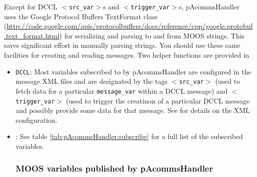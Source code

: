 \documentclass[11pt, letterpaper, oneside]{memoir}
\newcommand{\xmltag}[1]{\texttt{$<$#1$>$}}
\begin{document}
Except for DCCL \xmltag{src\_var}s and \xmltag{trigger\_var}s, pAcommsHandler uses the Google Protocol Buffers TextFormat class (\url{http://code.google.com/apis/protocolbuffers/docs/reference/cpp/google.protobuf.text_format.html}) for serializing and parsing to and from MOOS strings. This saves significant effort in manually parsing strings. You should use these same facilities for creating and reading messages. Two helper functions are provided in 

\begin{itemize}
\item \verb|DCCL|: Most variables subscribed to by pAcommsHandler are configured in the message XML files and are designated by the tags \xmltag{src\_var} (used to fetch data for a particular \verb|message_var| within a DCCL message) and \xmltag{trigger\_var} (used to trigger the creatinon of a particular DCCL message and possibly provide some data for that message. See \label{sec:dccl_overview} for details on the XML configuration. 
\item \verb||: 
See table \ref{tab:pAcommsHandler:subscribe} for a full list of the subscribed variables.

\subsubsection{MOOS variables published by pAcommsHandler}


\end{itemize}
\end{document}
